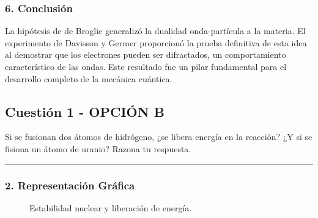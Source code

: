 \subsubsection*{6. Conclusión}
\begin{cajaconclusion}
La hipótesis de de Broglie generalizó la dualidad onda-partícula a la materia. El experimento de Davisson y Germer proporcionó la prueba definitiva de esta idea al demostrar que los electrones pueden ser difractados, un comportamiento característico de las ondas. Este resultado fue un pilar fundamental para el desarrollo completo de la mecánica cuántica.
\end{cajaconclusion}

\newpage

\subsection{Cuestión 1 - OPCIÓN B}
\label{subsec:5B_2001_jun_ord}

\begin{cajaenunciado}
Si se fusionan dos átomos de hidrógeno, ¿se libera energía en la reacción? ¿Y si se fisiona un átomo de uranio? Razona tu respuesta.
\end{cajaenunciado}
\hrule

\subsubsection*{2. Representación Gráfica}
\begin{figure}[H]
    \centering
    \caption{Estabilidad nuclear y liberación de energía.}
\end{figure}

